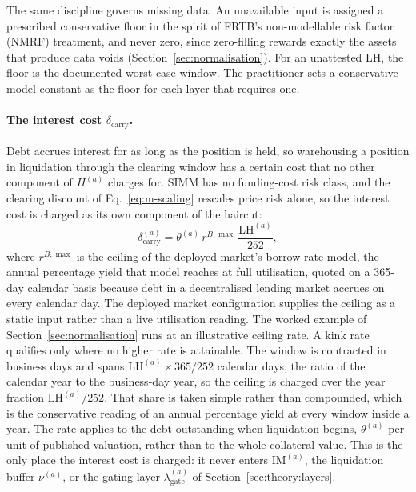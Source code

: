 The same discipline governs missing data. An unavailable input is assigned a prescribed conservative floor in the spirit of FRTB's non-modellable risk factor (NMRF) treatment, and never zero, since zero-filling rewards exactly the assets that produce data voids (Section~\ref{sec:normalisation}). For an unattested $\mathrm{LH}$, the floor is the documented worst-case window. The practitioner sets a conservative model constant as the floor for each layer that requires one.

\paragraph{The interest cost $\delta_{\mathrm{carry}}$.} Debt accrues interest for as long as the position is held, so warehousing a position in liquidation through the clearing window has a certain cost that no other component of $H^{(a)}$ charges for. SIMM has no funding-cost risk class, and the clearing discount of Eq.~\eqref{eq:m-scaling} rescales price risk alone, so the interest cost is charged as its own component of the haircut:
\begin{equation}\label{eq:delta-carry}
\delta_{\mathrm{carry}}^{(a)} = \theta^{(a)}\, r^{B,\max}\, \frac{\mathrm{LH}^{(a)}}{252},
\end{equation}
where $r^{B,\max}$ is the ceiling of the deployed market's borrow-rate model, the annual percentage yield that model reaches at full utilisation, quoted on a 365-day calendar basis because debt in a decentralised lending market accrues on every calendar day. The deployed market configuration supplies the ceiling as a static input rather than a live utilisation reading. The worked example of Section~\ref{sec:normalisation} runs at an illustrative ceiling rate. A kink rate qualifies only where no higher rate is attainable. The window is contracted in business days and spans $\mathrm{LH}^{(a)}\times 365/252$ calendar days, the ratio of the calendar year to the business-day year, so the ceiling is charged over the year fraction $\mathrm{LH}^{(a)}/252$. That share is taken simple rather than compounded, which is the conservative reading of an annual percentage yield at every window inside a year. The rate applies to the debt outstanding when liquidation begins, $\theta^{(a)}$ per unit of published valuation, rather than to the whole collateral value. This is the only place the interest cost is charged: it never enters $\mathrm{IM}^{(a)}$, the liquidation buffer $\nu^{(a)}$, or the gating layer $\lambda_{\mathrm{gate}}^{(a)}$ of Section~\ref{sec:theory:layers}.

